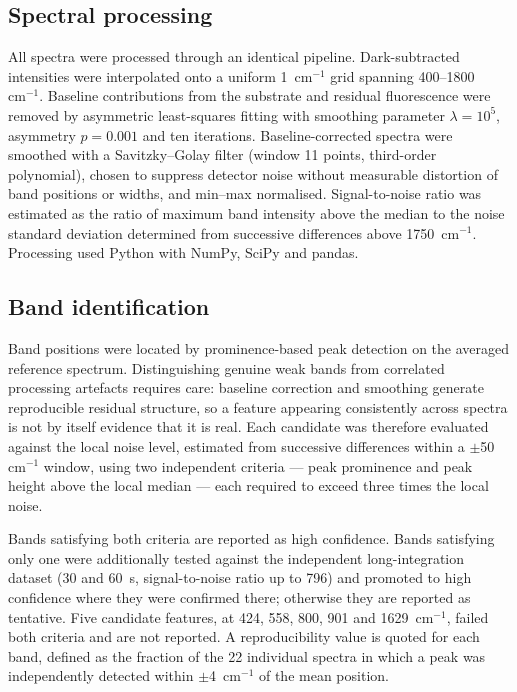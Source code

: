 \documentclass[11pt,a4paper]{article}
\newcommand{\wn}{\ensuremath{\mathrm{cm}^{-1}}}
\begin{document}
\subsection{Spectral processing}

All spectra were processed through an identical pipeline. Dark-subtracted
intensities were interpolated onto a uniform 1~\wn{} grid spanning
400--1800~\wn{}. Baseline contributions from the substrate and residual
fluorescence were removed by asymmetric least-squares fitting \cite{eilers2005}
with smoothing parameter $\lambda = 10^{5}$, asymmetry $p = 0.001$ and ten
iterations. Baseline-corrected spectra were smoothed with a Savitzky--Golay
filter \cite{savitzky1964} (window 11 points, third-order polynomial), chosen to
suppress detector noise without measurable distortion of band positions or
widths, and min--max normalised. Signal-to-noise ratio was estimated as the
ratio of maximum band intensity above the median to the noise standard deviation
determined from successive differences above 1750~\wn{}. Processing used Python
with NumPy, SciPy and pandas.

\subsection{Band identification}

Band positions were located by prominence-based peak detection on the averaged
reference spectrum. Distinguishing genuine weak bands from correlated processing
artefacts requires care: baseline correction and smoothing generate reproducible
residual structure, so a feature appearing consistently across spectra is not by
itself evidence that it is real. Each candidate was therefore evaluated against
the local noise level, estimated from successive differences within a
$\pm$50~\wn{} window, using two independent criteria --- peak prominence and
peak height above the local median --- each required to exceed three times the
local noise.

Bands satisfying both criteria are reported as high confidence. Bands satisfying
only one were additionally tested against the independent long-integration
dataset (30 and 60~s, signal-to-noise ratio up to 796) and promoted to high
confidence where they were confirmed there; otherwise they are reported as
tentative. Five candidate features, at 424, 558, 800, 901 and 1629~\wn{}, failed
both criteria and are not reported. A reproducibility value is quoted for each
band, defined as the fraction of the 22 individual spectra in which a peak was
independently detected within $\pm$4~\wn{} of the mean position.
\end{document}
